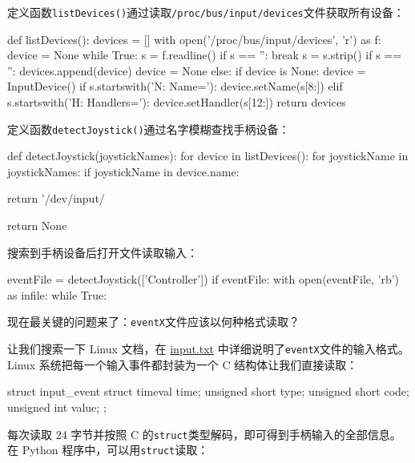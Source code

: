 定义函数\texttt{listDevices()}通过读取\texttt{/proc/bus/input/devices}文件获取所有设备：

\begin{pythoncode}
def listDevices():
    devices = []
    with open('/proc/bus/input/devices', 'r') as f:
        device = None
        while True:
            s = f.readline()
            if s == '':
                break
            s = s.strip()
            if s == '':
                devices.append(device)
                device = None
            else:
                if device is None:
                    device = InputDevice()
                if s.startswith('N: Name='):
                    device.setName(s[8:])
                elif s.startswith('H: Handlers='):
                    device.setHandler(s[12:])
    return devices
\end{pythoncode}

定义函数\texttt{detectJoystick()}通过名字模糊查找手柄设备：

\begin{pythoncode}
def detectJoystick(joystickNames):
    for device in listDevices():
        for joystickName in joystickNames:
            if joystickName in device.name:
                
                return '/dev/input/%
    
    return None
\end{pythoncode}

搜索到手柄设备后打开文件读取输入：

\begin{pythoncode}
eventFile = detectJoystick(['Controller'])
if eventFile:
    with open(eventFile, 'rb') as infile:
        while True:
            
\end{pythoncode}

现在最关键的问题来了：\texttt{eventX}文件应该以何种格式读取？

让我们搜索一下 Linux 文档，在
\href{https://www.kernel.org/doc/Documentation/input/input.txt}{input.txt}
中详细说明了\texttt{eventX}文件的输入格式。Linux
系统把每一个输入事件都封装为一个 C 结构体让我们直接读取：

\begin{pythoncode}
struct input_event {
    struct timeval time; 
    unsigned short type; 
    unsigned short code; 
    unsigned int value; 
};
\end{pythoncode}

每次读取 24 字节并按照 C
的\texttt{struct}类型解码，即可得到手柄输入的全部信息。在 Python
程序中，可以用\texttt{struct}读取：

